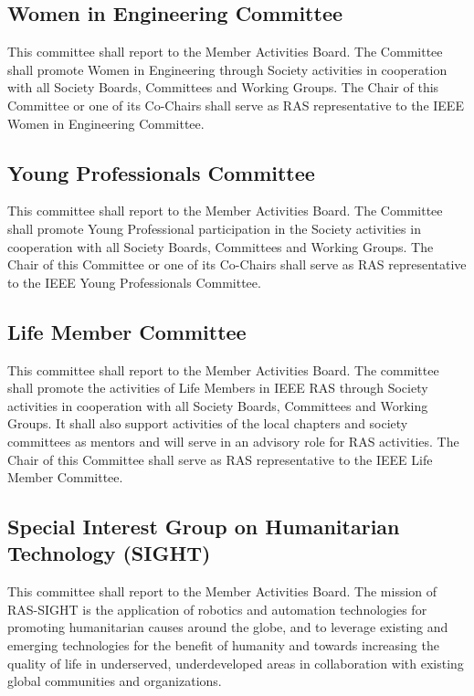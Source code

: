 \documentclass[10pt]{article}
\begin{document}
\subsection{Women in Engineering Committee}

This committee shall report to the Member Activities Board. The Committee shall promote Women in Engineering through Society activities in cooperation with all Society Boards, Committees and Working Groups. The Chair of this Committee or one of its Co-Chairs shall serve as RAS representative to the IEEE Women in Engineering Committee.


\subsection{Young Professionals Committee}

This committee shall report to the Member Activities Board. The Committee shall promote Young Professional participation in the Society activities in cooperation with all Society Boards, Committees and Working Groups. The Chair of this Committee or one of its Co-Chairs shall serve as RAS representative to the IEEE Young Professionals Committee.


\subsection{Life Member Committee}

This committee shall report to the Member Activities Board. The committee shall promote the activities of Life Members in IEEE RAS through Society activities in cooperation with all Society Boards, Committees and Working Groups. It shall also support activities of the local chapters and society committees as mentors and will serve in an advisory role for RAS activities. The Chair of this Committee shall serve as RAS representative to the IEEE Life Member Committee.


\subsection{Special Interest Group on Humanitarian Technology (SIGHT)}

This committee shall report to the Member Activities Board. The mission of RAS-SIGHT is the application of robotics and automation technologies for promoting humanitarian causes around the globe, and to leverage existing and emerging technologies for the benefit of humanity and towards increasing the quality of life in underserved, underdeveloped areas in collaboration with existing global communities and organizations.
\end{document}
